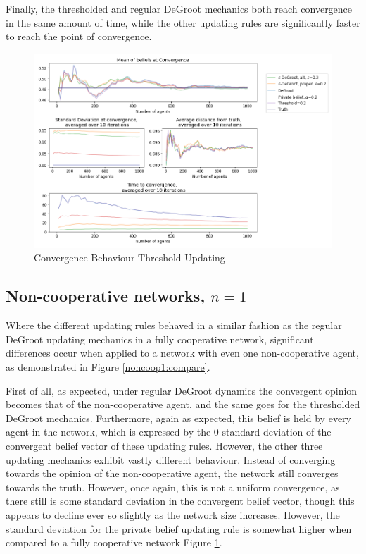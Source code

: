 \documentclass{article}
\begin{document}
\noindent Finally, the thresholded and regular DeGroot mechanics both reach convergence in the same amount of time, while the other updating rules are significantly faster to reach the point of convergence.

\begin{center}
    \begin{figure}[!htbp]
        \centering
        \includegraphics[width=1.2\textwidth]{ThesisKI/Images/WisdomCompare0.png}
        \caption{Convergence Behaviour Threshold Updating}
        \label{coop:compare}
    \end{figure}
\end{center}

\newpage

\subsection{Non-cooperative networks, $n=1$}

Where the different updating rules behaved in a similar fashion as the regular DeGroot updating mechanics in a fully cooperative network, significant differences occur when applied to a network with even one non-cooperative agent, as demonstrated in Figure \ref{noncoop1:compare}. 

\noindent First of all, as expected, under regular DeGroot dynamics the convergent opinion becomes that of the non-cooperative agent, and the same goes for the thresholded DeGroot mechanics. Furthermore, again as expected, this belief is held by every agent in the network, which is expressed by the $0$ standard deviation of the convergent belief vector of these updating rules. However, the other three updating mechanics exhibit vastly different behaviour. Instead of converging towards the opinion of the non-cooperative agent, the network still converges towards the truth. However, once again, this is not a uniform convergence, as there still is some standard deviation in the convergent belief vector, though this appears to decline ever so slightly as the network size increases. However, the standard deviation for the private belief updating rule is somewhat higher when compared to a fully cooperative network Figure \ref{coop:compare}.
\end{document}
